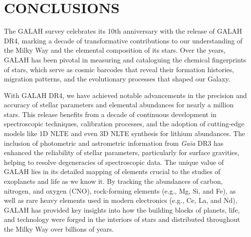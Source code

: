 \documentclass[
  journal=pasa,
  manuscript=research-paper, %
  year=2024,
  volume=37
]{cup-journal}
\newcommand{\Gaia}{\textit{Gaia}\xspace}
\begin{document}
\section{CONCLUSIONS}
\label{sec:conclusion}

The GALAH survey celebrates its 10th anniversary with the release of GALAH DR4, marking a decade of transformative contributions to our understanding of the Milky Way and the elemental composition of its stars. Over the years, GALAH has been pivotal in measuring and cataloguing the chemical fingerprints of stars, which serve as cosmic barcodes that reveal their formation histories, migration patterns, and the evolutionary processes that shaped our Galaxy.

With GALAH DR4, we have achieved notable advancements in the precision and accuracy of stellar parameters and elemental abundances for nearly a million stars. This release benefits from a decade of continuous development in spectroscopic techniques, calibration processes, and the adoption of cutting-edge models like 1D NLTE and even 3D NLTE synthesis for lithium abundances. The inclusion of photometric and astrometric information from \Gaia DR3 has enhanced the reliability of stellar parameters, particularly for surface gravities, helping to resolve degeneracies of spectroscopic data. The unique value of GALAH lies in its detailed mapping of elements crucial to the studies of exoplanets and life as we know it. By tracking the abundances of carbon, nitrogen, and oxygen (CNO), rock-forming elements (e.g., Mg, Si, and Fe), as well as rare heavy elements used in modern electronics (e.g., Ce, La, and Nd), GALAH has provided key insights into how the building blocks of planets, life, and technology were forged in the interiors of stars and distributed throughout the Milky Way over billions of years.
\end{document}
